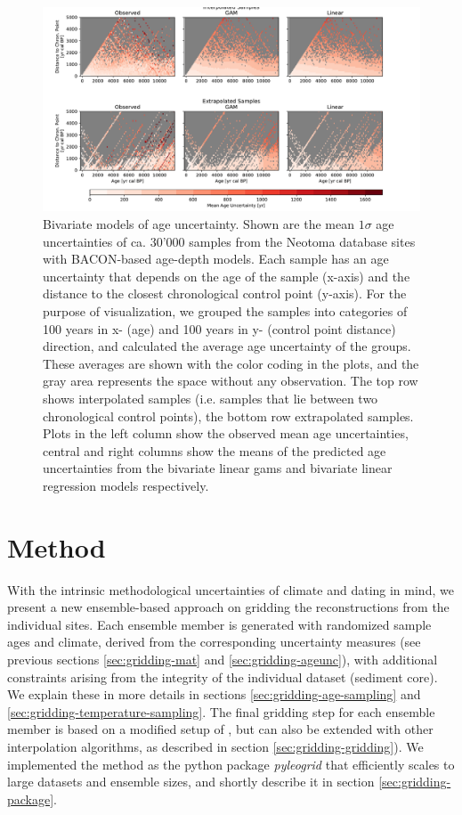 \begin{refsection}
\begin{figure}
	\includegraphics[width=\linewidth]{gridding-figures/bivariate-models.pdf}
	\caption[Univariate age uncertainty models]{Bivariate models of age uncertainty. Shown are the mean $1\sigma$ age uncertainties of ca. 30'000 samples from the Neotoma database sites with BACON-based age-depth models. Each sample has an age uncertainty that depends on the age of the sample (x-axis) and the distance to the closest chronological control point (y-axis). For the purpose of visualization, we grouped the samples into categories of 100 years in x- (age) and 100 years in y- (control point distance) direction, and calculated the average age uncertainty of the groups. These averages are shown with the color coding in the plots, and the gray area represents the space without any observation. The top row shows interpolated samples (i.e. samples that lie between two chronological control points), the bottom row extrapolated samples. Plots in the left column show the observed mean age uncertainties, central and right columns show the means of the predicted age uncertainties from the bivariate linear \glspl{gam} and bivariate linear regression models respectively. }
	\label{fig:gridding-bivariate-age-unc}
\end{figure}

\section{Method}  \label{sec:gridding-method}
With the intrinsic methodological uncertainties of climate and dating in mind, we present a new ensemble-based approach on gridding the reconstructions from the individual sites. Each ensemble member is generated with randomized sample ages and climate, derived from the corresponding uncertainty measures (see previous sections \ref{sec:gridding-mat} and \ref{sec:gridding-ageunc}), with additional constraints arising from the integrity of the individual dataset (sediment core). We explain these in more details in sections \ref{sec:gridding-age-sampling} and \ref{sec:gridding-temperature-sampling}. The final gridding step for each ensemble member is based on a modified setup of \cite{MauriDavisCollinsEtAl2015}, but can also be extended with other interpolation algorithms, as described in section \ref{sec:gridding-gridding}). We implemented the method as the python package \textit{pyleogrid} that efficiently scales to large datasets and ensemble sizes, and shortly describe it in section \ref{sec:gridding-package}.


\end{refsection}
